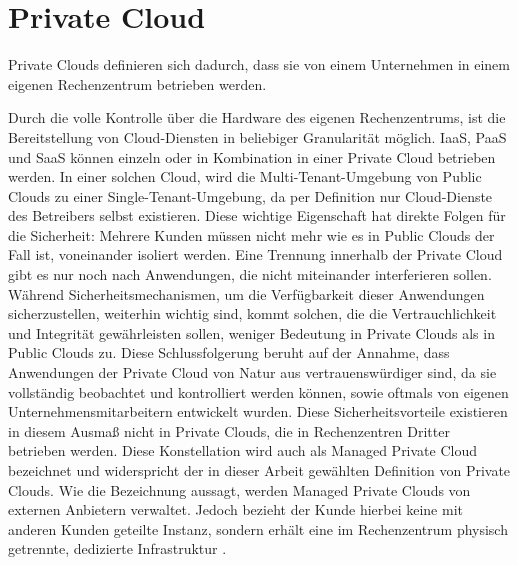 \documentclass[../main.tex]{subfiles}
\begin{document}

  \section{Private Cloud}
  \label{privateCloud}
    Private Clouds definieren sich dadurch, dass sie von einem Unternehmen in einem eigenen Rechenzentrum betrieben werden.

    Durch die volle Kontrolle über die Hardware des eigenen Rechenzentrums, ist die Bereitstellung von Cloud-Diensten in beliebiger Granularität möglich. IaaS, PaaS und SaaS können einzeln oder in Kombination in einer Private Cloud betrieben werden. In einer solchen Cloud, wird die Multi-Tenant-Umgebung von Public Clouds zu einer Single-Tenant-Umgebung, da per Definition nur Cloud-Dienste des Betreibers selbst existieren. Diese wichtige Eigenschaft hat direkte Folgen für die Sicherheit:
    Mehrere Kunden müssen nicht mehr wie es in Public Clouds der Fall ist, voneinander isoliert werden. Eine Trennung innerhalb der Private Cloud gibt es nur noch nach Anwendungen, die nicht miteinander interferieren sollen. Während Sicherheitsmechanismen, um die Verfügbarkeit dieser Anwendungen sicherzustellen, weiterhin wichtig sind, kommt solchen, die die Vertrauchlichkeit und Integrität gewährleisten sollen, weniger Bedeutung in Private Clouds als in Public Clouds zu. Diese Schlussfolgerung beruht auf der Annahme, dass Anwendungen der Private Cloud von Natur aus vertrauenswürdiger sind, da sie vollständig beobachtet und kontrolliert werden können, sowie oftmals von eigenen Unternehmensmitarbeitern entwickelt wurden.
    Diese Sicherheitsvorteile existieren in diesem Ausmaß nicht in Private Clouds, die in Rechenzentren Dritter betrieben werden. Diese Konstellation wird auch als Managed Private Cloud bezeichnet und widerspricht der in dieser Arbeit gewählten Definition von Private Clouds. Wie die Bezeichnung aussagt, werden Managed Private Clouds von externen Anbietern verwaltet. Jedoch bezieht der Kunde hierbei keine mit anderen Kunden geteilte Instanz, sondern erhält eine im Rechenzentrum physisch getrennte, dedizierte Infrastruktur \cite{softlayerPrivateCloud}.
\end{document}
